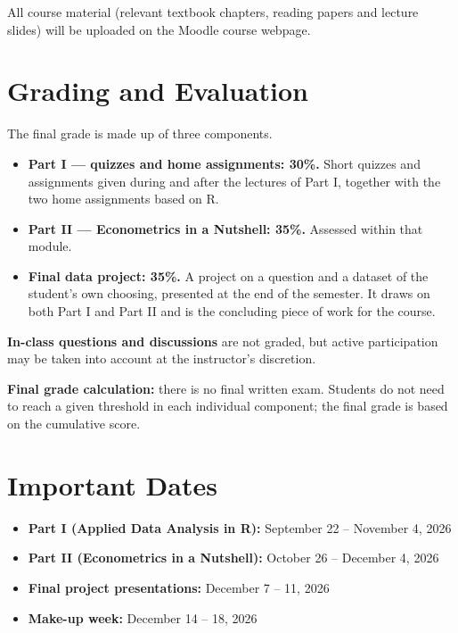 \documentclass[11pt]{article}
\begin{document}
All course material (relevant textbook chapters, reading papers and lecture slides) will be uploaded on the
Moodle course webpage.

\section{Grading and Evaluation}

The final grade is made up of three components.

\begin{itemize}
  \item \textbf{Part I --- quizzes and home assignments: 30\%.} Short quizzes and assignments given during
        and after the lectures of Part I, together with the two home assignments based on R.
  \item \textbf{Part II --- Econometrics in a Nutshell: 35\%.} Assessed within that module.
  \item \textbf{Final data project: 35\%.} A project on a question and a dataset of the student's own
        choosing, presented at the end of the semester. It draws on both Part I and Part II and is the
        concluding piece of work for the course.
\end{itemize}

\noindent\textbf{In-class questions and discussions} are not graded, but active participation may be taken
into account at the instructor's discretion.

\smallskip
\noindent\textbf{Final grade calculation:} there is no final written exam. Students do not need to reach a
given threshold in each individual component; the final grade is based on the cumulative score.

\section{Important Dates}

\begin{itemize}
  \item \textbf{Part I (Applied Data Analysis in R):} September 22 -- November 4, 2026
  \item \textbf{Part II (Econometrics in a Nutshell):} October 26 -- December 4, 2026
  \item \textbf{Final project presentations:} December 7 -- 11, 2026
  \item \textbf{Make-up week:} December 14 -- 18, 2026
\end{itemize}
\end{document}
